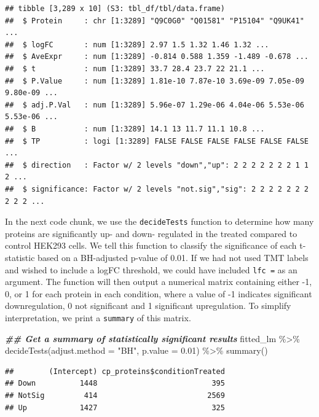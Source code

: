 \documentclass[9pt,a4paper,]{extarticle}
\newenvironment{Shaded}{\begin{snugshade}}{\end{snugshade}}
\newcommand{\AttributeTok}[1]{\textcolor[rgb]{0.77,0.63,0.00}{#1}}
\newcommand{\DocumentationTok}[1]{\textcolor[rgb]{0.56,0.35,0.01}{\textbf{\textit{#1}}}}
\newcommand{\FloatTok}[1]{\textcolor[rgb]{0.00,0.00,0.81}{#1}}
\newcommand{\FunctionTok}[1]{\textcolor[rgb]{0.00,0.00,0.00}{#1}}
\newcommand{\NormalTok}[1]{#1}
\newcommand{\SpecialCharTok}[1]{\textcolor[rgb]{0.00,0.00,0.00}{#1}}
\newcommand{\StringTok}[1]{\textcolor[rgb]{0.31,0.60,0.02}{#1}}
\begin{document}
\begin{verbatim}
## tibble [3,289 x 10] (S3: tbl_df/tbl/data.frame)
##  $ Protein     : chr [1:3289] "Q9C0G0" "Q01581" "P15104" "Q9UK41" ...
##  $ logFC       : num [1:3289] 2.97 1.5 1.32 1.46 1.32 ...
##  $ AveExpr     : num [1:3289] -0.814 0.588 1.359 -1.489 -0.678 ...
##  $ t           : num [1:3289] 33.7 28.4 23.7 22 21.1 ...
##  $ P.Value     : num [1:3289] 1.81e-10 7.87e-10 3.69e-09 7.05e-09 9.80e-09 ...
##  $ adj.P.Val   : num [1:3289] 5.96e-07 1.29e-06 4.04e-06 5.53e-06 5.53e-06 ...
##  $ B           : num [1:3289] 14.1 13 11.7 11.1 10.8 ...
##  $ TP          : logi [1:3289] FALSE FALSE FALSE FALSE FALSE FALSE ...
##  $ direction   : Factor w/ 2 levels "down","up": 2 2 2 2 2 2 2 1 1 2 ...
##  $ significance: Factor w/ 2 levels "not.sig","sig": 2 2 2 2 2 2 2 2 2 2 ...
\end{verbatim}

In the next code chunk, we use the \texttt{decideTests} function to determine how many
proteins are significantly up- and down- regulated in the treated compared to control
HEK293 cells. We tell this function to classify the significance of each
t-statistic based on a BH-adjusted p-value of 0.01. If we had not used TMT
labels and wished to include a logFC threshold, we could have included \texttt{lfc\ =}
as an argument. The function will then output a numerical matrix containing
either -1, 0, or 1 for each protein in each condition, where a value of -1
indicates significant downregulation, 0 not significant and 1 significant
upregulation. To simplify interpretation, we print a \texttt{summary} of this matrix.

\begin{Shaded}
\begin{Highlighting}[]
\DocumentationTok{\#\# Get a summary of statistically significant results}
\NormalTok{fitted\_lm }\SpecialCharTok{\%\textgreater{}\%}
  \FunctionTok{decideTests}\NormalTok{(}\AttributeTok{adjust.method =} \StringTok{"BH"}\NormalTok{,}
              \AttributeTok{p.value =} \FloatTok{0.01}\NormalTok{) }\SpecialCharTok{\%\textgreater{}\%}
  \FunctionTok{summary}\NormalTok{()}
\end{Highlighting}
\end{Shaded}

\begin{verbatim}
##        (Intercept) cp_proteins$conditionTreated
## Down          1448                          395
## NotSig         414                         2569
## Up            1427                          325
\end{verbatim}
\end{document}
